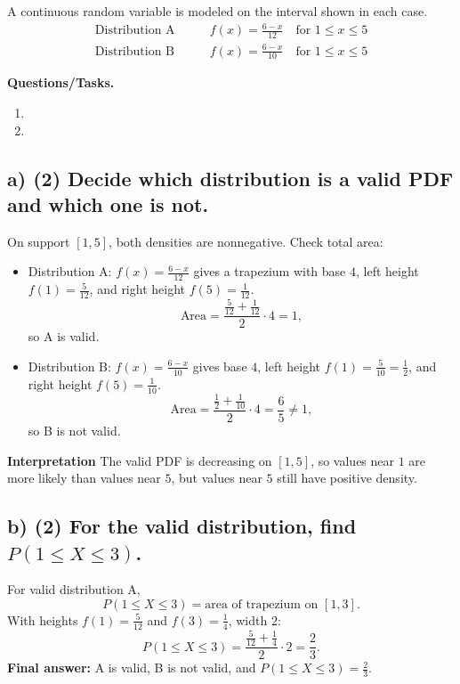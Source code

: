 A continuous random variable is modeled on the interval shown in each case.
\[ \begin{aligned}
\text{Distribution A} & \qquad f(x)=\frac{6-x}{12}\quad\text{for }1\le x\le 5 \\
\text{Distribution B} & \qquad f(x)=\frac{6-x}{10}\quad\text{for }1\le x\le 5
\end{aligned}
\]

\textbf{Questions/Tasks.}
\begin{enumerate}[label=\textbf{\alph*)}]
	\item {}
	\item {}
\end{enumerate}


\subsection*{a) \textbf{(2)} Decide which distribution is a valid PDF and which one is not.}
\label{subsec:checking-two-candidate-density-functions-iii-c1-a}

On support $[1,5]$, both densities are nonnegative. Check total area:
\begin{itemize}
	\item Distribution A: $f(x)=\frac{6-x}{12}$ gives a trapezium with base $4$, left height $f(1)=\frac{5}{12}$, and right height $f(5)=\frac{1}{12}$.
	\[
	\text{Area}=\frac{\frac{5}{12}+\frac{1}{12}}{2}\cdot 4=1,
	\]
	so A is valid.
	\item Distribution B: $f(x)=\frac{6-x}{10}$ gives base $4$, left height $f(1)=\frac{5}{10}=\frac12$, and right height $f(5)=\frac{1}{10}$.
	\[
	\text{Area}=\frac{\frac12+\frac{1}{10}}{2}\cdot 4=\frac65\ne1,
	\]
	so B is not valid.
\end{itemize}

\textbf{Interpretation}
The valid PDF is decreasing on $[1,5]$, so values near $1$ are more likely than values near $5$, but values near $5$ still have positive density.


\subsection*{b) \textbf{(2)} For the valid distribution, find $P(1\le X\le 3)$.}
\label{subsec:checking-two-candidate-density-functions-iii-c1-b}
For valid distribution A,
\[
P(1\le X\le3)=\text{area of trapezium on }[1,3].
\]
With heights $f(1)=\frac{5}{12}$ and $f(3)=\frac14$, width $2$:
\[
P(1\le X\le3)=\frac{\frac{5}{12}+\frac14}{2}\cdot 2=\frac23.
\]
\textbf{Final answer:} A is valid, B is not valid, and $P(1\le X\le3)=\frac23$.

